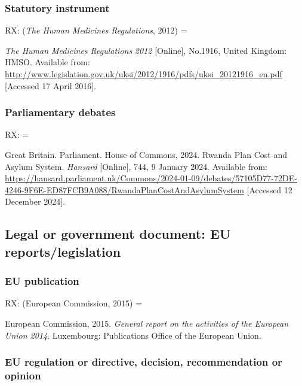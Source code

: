 \subsubsection*{Statutory instrument}

RX: (\emph{The Human Medicines Regulations}, 2012) = \cite{gb.hmr2012}

\emph{The Human Medicines Regulations} \emph{2012} [Online], No.1916, United Kingdom: HMSO. Available from: \url{http://www.legislation.gov.uk/uksi/2012/1916/pdfs/uksi_20121916_en.pdf} [Accessed 17 April 2016].




\subsubsection*{Parliamentary debates}

RX: = \cite{gb.hc2024rpc}

Great Britain. Parliament. House of Commons, 2024. Rwanda Plan Cost and Asylum System. \emph{Hansard} [Online], 744, 9 January 2024. Available from: \url{https://hansard.parliament.uk/Commons/2024-01-09/debates/57105D77-72DE-4246-9F6E-ED87FCB9A088/RwandaPlanCostAndAsylumSystem} [Accessed 12 December 2024].



\subsection{Legal or government document: EU reports\slash legislation}


\subsubsection*{EU publication}

RX: (European Commission, 2015) = \cite{ec2015gra}

European Commission, 2015. \emph{General report on the activities of the European Union 2014}. Luxembourg: Publications Office of the European Union.




\subsubsection*{EU regulation or directive, decision, recommendation or opinion}

